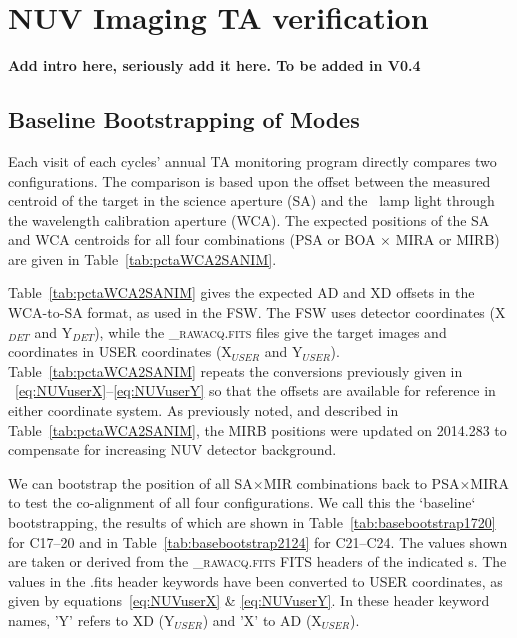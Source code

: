 \section{NUV Imaging TA verification}\label{sec:NimVER}

{\bf Add intro here, seriously add it here. To be added in V0.4}

%

\subsection{Baseline Bootstrapping of  Modes}\label{subsec:basebootstrap}

Each visit of each cycles' annual TA monitoring program directly compares two  configurations.
The comparison is based upon the offset between the measured centroid of the target in the science aperture (SA) and the \plamptwo\ lamp light through the wavelength calibration aperture (WCA).
The expected positions of the SA and WCA centroids for all four combinations (PSA or BOA $\times$ MIRA or MIRB) are given in Table~\ref{tab:pctaWCA2SANIM}.

Table~\ref{tab:pctaWCA2SANIM} gives the expected AD and XD offsets in the WCA-to-SA format, as used in the FSW.
The FSW uses detector coordinates (X$_{DET}$ and Y$_{DET}$), while the \textsc{\_rawacq.fits} files give the target images and
coordinates in USER coordinates (X$_{USER}$ and Y$_{USER}$). Table~\ref{tab:pctaWCA2SANIM} repeats the conversions previously
given in ~\ref{eq:NUVuserX}--\ref{eq:NUVuserY} so that the offsets are available for reference in either coordinate system.
As previously noted, and described in Table~\ref{tab:pctaWCA2SANIM}, the MIRB positions were updated on 2014.283 to compensate for increasing NUV detector background.

We can bootstrap the position of all SA$\times$MIR combinations back to PSA$\times$MIRA to test the co-alignment of all four configurations.
We call this the `baseline` bootstrapping, the results of which are shown in Table~\ref{tab:basebootstrap1720}
for C17--20 and in Table~\ref{tab:basebootstrap2124} for C21--C24.
The values shown	 are taken or derived from the \textsc{\_rawacq.fits} FITS
headers of the indicated s. The values in the .fits header keywords have been converted
to USER coordinates, as given by equations~\ref{eq:NUVuserX} \& \ref{eq:NUVuserY}.
In these header keyword names, 'Y' refers to XD (Y$_{USER}$) and 'X' to AD (X$_{USER}$).\\


